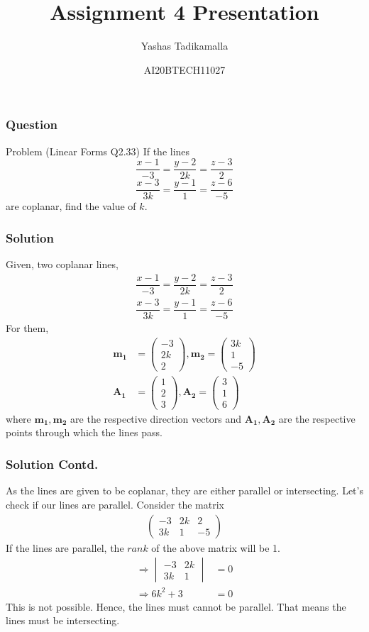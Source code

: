 \documentclass{beamer}
\title{Assignment 4 Presentation}
\author{Yashas Tadikamalla}
\date{AI20BTECH11027}
\newcommand{\myvec}[1]{\ensuremath{\begin{pmatrix}#1\end{pmatrix}}}
\renewcommand{\vec}[1]{\mathbf{#1}}
\newcommand{\mydet}[1]{\ensuremath{\begin{vmatrix}#1\end{vmatrix}}}
\begin{document}
\begin{frame}
\titlepage
\end{frame}

\begin{frame}
\frametitle{Question}
\begin{block}{Problem (Linear Forms Q2.33)}
If the lines
$$\dfrac{x-1}{-3}=\dfrac{y-2}{2k}=\dfrac{z-3}{2}$$
$$\dfrac{x-3}{3k}=\dfrac{y-1}{1}=\dfrac{z-6}{-5}$$
are coplanar, find the value of $k$.
\end{block}
\end{frame}



\begin{frame}
\frametitle{Solution}
Given, two coplanar lines,
\begin{align}
\dfrac{x-1}{-3}=\dfrac{y-2}{2k}=\dfrac{z-3}{2}\\
\dfrac{x-3}{3k}=\dfrac{y-1}{1}=\dfrac{z-6}{-5}
\end{align}
For them,
\begin{align}
    \vec{m_{1}}&=\myvec{-3\\
    2k\\
    2}, \vec{m_{2}}=\myvec{3k\\
    1\\
    -5}\\
    \vec{A_{1}}&=\myvec{1\\
    2\\
    3}, \vec{A_{2}}=\myvec{3\\
    1\\
    6}
\end{align}
where $\vec{m_{1}},\vec{m_{2}}$ are the respective direction vectors and $\vec{A_{1}},\vec{A_{2}}$ are the respective points through which the lines pass.
\end{frame}

\begin{frame}
\frametitle{Solution Contd.}
As the lines are given to be coplanar, they are either parallel or intersecting.
Let's check if our lines are parallel. Consider the matrix
\begin{align}
    \myvec{-3 & 2k & 2 \\
    3k & 1 & -5}
\end{align}
If the lines are parallel, the $rank$ of the above matrix will be 1.
\begin{align}
    \Rightarrow \mydet{-3 & 2k \\
    3k & 1} &=0\\
    \Rightarrow 6k^{2}+3&=0
\end{align}
This is not possible. Hence, the lines must cannot be parallel. That means the lines must be intersecting.
\end{frame}
\end{document}
